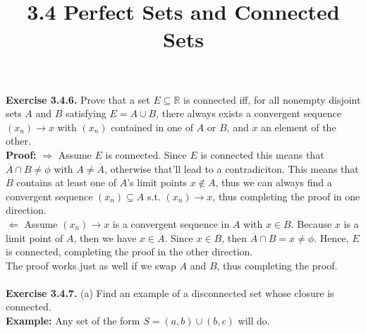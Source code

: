 \documentclass{article}
\title{\textbf{3.4 Perfect Sets and Connected Sets}}
\begin{document}
	\maketitle
	\textbf{Exercise 3.4.6.} Prove that a set $E \subseteq \mathbb{R}$ is connected iff, for all nonempty disjoint sets $A$ and $B$ satisfying $E = A \cup B$, there always exists a convergent sequence $(x_n) \to x$ with $(x_n)$ contained in one of $A$ or $B$, and $x$ an element of the other. \\
	\textbf{Proof:} $\Rightarrow$ Assume $E$ is connected. Since $E$ is connected this means that $\overline{A} \cap B \neq \phi$ with $A \neq \overline{A}$, otherwise that'll lead to a contradiciton. This means that $B$ contains at least one of $A$'s limit points $x \not\in A$, thus we can always find a convergent sequence $(x_n) \subseteq A$ s.t. $(x_n) \to x$, thus completing the proof in one direction. \\
	$\Leftarrow$ Assume $(x_n) \to x$ is a convergent sequence in $A$ with $x \in B$. Because $x$ is a limit point of $A$, then we have $x \in \overline{A}$. Since $x \in B$, then $\overline{A} \cap B = x \neq \phi$. Hence, $E$ is connected, completing the proof in the other direction. \\ 
	The proof works just as well if we swap $A$ and $B$, thus completing the proof. \\ \\
	\textbf{Exercise 3.4.7.} (a) Find an example of a disconnected set whose closure is connected. \\ 
	\textbf{Example:} Any set of the form $S = (a, b) \cup (b, c)$ will do. 
\end{document}
